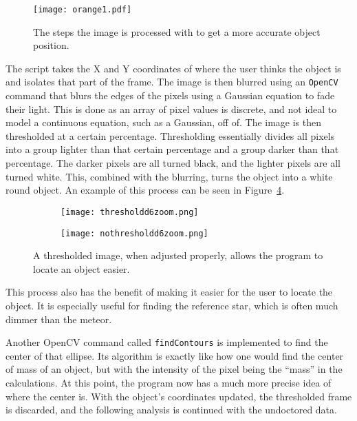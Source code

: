 \begin{figure}[h!]
	\centering
	\texttt{[image: orange1.pdf]}
	\caption{The steps the image is processed with to get a more accurate object position.}
	\label{fig:contourfinder}
\end{figure}

The script takes the X and Y coordinates of where the user thinks the object is and isolates that part of the frame. The image is then blurred using an \texttt{OpenCV} command that blurs the edges of the pixels using a Gaussian equation to fade their light. This is done as an array of pixel values is discrete, and not ideal to model a continuous equation, such as a Gaussian, off of. The image is then thresholded at a certain percentage. Thresholding essentially divides all pixels into a group lighter than that certain percentage and a group darker than that percentage. The darker pixels are all turned black, and the lighter pixels are all turned white. This, combined with the blurring, turns the object into a white round object. An example of this process can be seen in Figure~\ref{fig:ThresholdComparison}.
\begin{figure}
\centering
\begin{subfigure}{.5\textwidth}
  \centering
  \texttt{[image: thresholdd6zoom.png]}
  \label{fig:nothresholdd6}
\end{subfigure}%
\begin{subfigure}{.5\textwidth}
  \centering
  \texttt{[image: nothresholdd6zoom.png]}
  \label{fig:thresholdd6}
\end{subfigure}
\caption{A thresholded image, when adjusted properly, allows the program to locate an object easier.}
\label{fig:ThresholdComparison}
\end{figure}
This process also has the benefit of making it easier for the user to locate the object. It is especially useful for finding the reference star, which is often much dimmer than the meteor. 

Another OpenCV command called \texttt{findContours} is implemented to find the center of that ellipse. Its algorithm is exactly like how one would find the center of mass of an object, but with the intensity of the pixel being the ``mass'' in the calculations. At this point, the program now has a much more precise idea of where the center is. With the object's coordinates updated, the thresholded frame is discarded, and the following analysis is continued with the undoctored data. 


